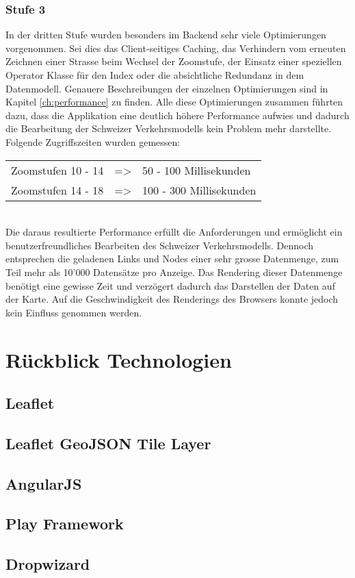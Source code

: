 \subsubsection*{Stufe 3}
In der dritten Stufe wurden besonders im Backend sehr viele Optimierungen vorgenommen. Sei dies das Client-seitiges Caching, das Verhindern vom erneuten Zeichnen einer Strasse beim Wechsel der Zoomstufe, der Einsatz einer speziellen Operator Klasse für den Index oder die absichtliche Redundanz in dem Datenmodell. Genauere Beschreibungen der einzelnen Optimierungen sind in Kapitel \ref{ch:performance}  zu finden. Alle diese Optimierungen zusammen führten dazu, dass die Applikation eine deutlich höhere Performance aufwies und dadurch die Bearbeitung der Schweizer Verkehrsmodells kein Problem mehr darstellte.\\
Folgende Zugriffszeiten wurden gemessen:\\[0.3cm]
\begin{tabular}{ l c l}
Zoomstufen 10 - 14 & => & 50 - 100 Millisekunden \\
Zoomstufen 14 - 18 & => & 100 - 300 Millisekunden \\ 
\end{tabular}\\[0.3cm]
Die daraus resultierte Performance erfüllt die Anforderungen und ermöglicht ein benutzerfreundliches Bearbeiten des Schweizer Verkehrsmodells. Dennoch entsprechen die geladenen Links und Nodes einer sehr grosse Datenmenge, zum Teil mehr als 10'000 Datensätze pro Anzeige. Das Rendering dieser Datenmenge benötigt eine gewisse Zeit und verzögert dadurch das Darstellen der Daten auf der Karte. Auf die Geschwindigkeit des Renderings des Browsers konnte jedoch kein Einfluss genommen werden.
\section{Rückblick Technologien}
\subsection*{Leaflet}
\subsection*{Leaflet GeoJSON Tile Layer}
\subsection*{AngularJS}
\subsection*{Play Framework}
\subsection*{Dropwizard}